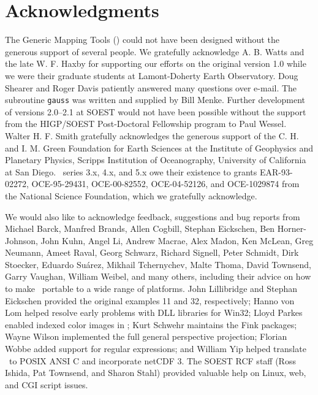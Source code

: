 %
%


\chapter*{Acknowledgments}

The Generic Mapping Tools (\GMT) could not have been designed without
the generous support of several people.  We gratefully acknowledge
A. B. Watts and the late W. F. Haxby for supporting our efforts on the original
version 1.0 while we were their graduate students at Lamont-Doherty
Earth Observatory.  Doug Shearer and Roger Davis patiently answered
many questions over e-mail.  The subroutine \texttt{gauss}
was written and supplied by Bill Menke.
Further development of versions 2.0--2.1 at SOEST would not have
been possible without the support from the HIGP/SOEST
Post-Doctoral Fellowship program to Paul Wessel.  Walter H. F. Smith
gratefully acknowledges the generous support of the C. H. and I. M.
Green Foundation for Earth Sciences at the Institute of Geophysics
and Planetary Physics, Scripps Institution of Oceanography, University
of California at San Diego.
\GMT\ series 3.x, 4.x, and 5.x owe their existence to grants
EAR-93-02272, OCE-95-29431, OCE-00-82552, OCE-04-52126, and OCE-1029874
from the National Science Foundation, which we gratefully acknowledge.

We would also like to acknowledge feedback, suggestions and bug reports
from
Michael Barck,
Manfred Brands,
Allen Cogbill,
Stephan Eickschen,
Ben Horner-Johnson,
John Kuhn,
Angel Li,
Andrew Macrae,
Alex Madon,
Ken McLean,
Greg Neumann,
Ameet Raval,
Georg Schwarz,
Richard Signell,
Peter Schmidt,
Dirk Stoecker,
Eduardo Su\'{a}rez,
Mikhail Tchernychev,
Malte Thoma,
David Townsend,
Garry Vaughan,
William Weibel,
and many others, including their advice
on how to make \GMT\ portable to a wide range of platforms.
John Lillibridge and Stephan Eickschen provided the original examples 11 and 32, respectively;
Hanno von Lom helped resolve early problems with DLL libraries for Win32;
Lloyd Parkes enabled indexed color images in \PS;
Kurt Schwehr maintains the \textsf{Fink} packages;
Wayne Wilson implemented the full general perspective projection;
Florian Wobbe added support for regular expressions;
and William Yip helped translate \GMT\ to POSIX ANSI C and incorporate netCDF 3.
The SOEST RCF staff (Ross Ishida, Pat Townsend, and Sharon Stahl) provided valuable help
on Linux, web, and CGI script issues.


